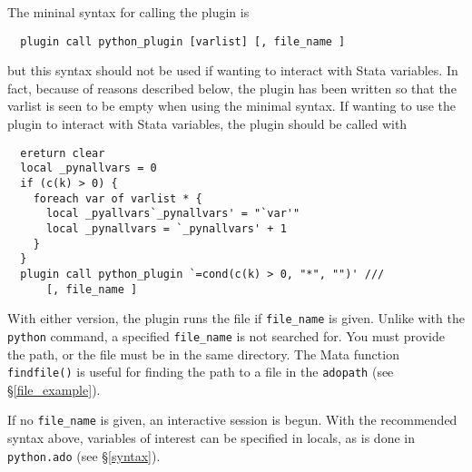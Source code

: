 \documentclass{article}
\begin{document}
The mininal syntax for calling the plugin is
{\small
	\begin{lstlisting}
  plugin call python_plugin [varlist] [, file_name ]
	\end{lstlisting}
}
	
\noindent but this syntax should not be used if wanting to interact with Stata variables. In fact, because of reasons described below, the plugin has been written so that the varlist is seen to be empty when using the minimal syntax. If wanting to use the plugin to interact with Stata variables, the plugin should be called with 
{\small
	\begin{lstlisting}
  ereturn clear
  local _pynallvars = 0
  if (c(k) > 0) {
    foreach var of varlist * {
      local _pyallvars`_pynallvars' = "`var'"
      local _pynallvars = `_pynallvars' + 1
    }
  }
  plugin call python_plugin `=cond(c(k) > 0, "*", "")' ///
      [, file_name ]
	\end{lstlisting}
}
	
With either version, the plugin runs the file if \lstinline{file_name} is given. Unlike with the \lstinline{python} command, a specified \lstinline{file_name} is not searched for. You must provide the path, or the file must be in the same directory. The Mata function \lstinline{findfile()} is useful for finding the path to a file in the \lstinline{adopath} (see \S\ref{file_example}).

If no \lstinline{file_name} is given, an interactive session is begun. With the recommended syntax above, variables of interest can be specified in locals, as is done in \lstinline{python.ado} (see \S\ref{syntax}).
	
\end{document}

